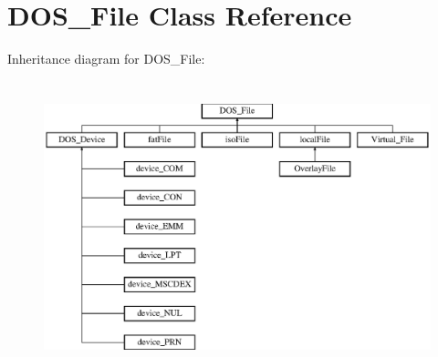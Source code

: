 \hypertarget{classDOS__File}{\section{D\-O\-S\-\_\-\-File Class Reference}
\label{classDOS__File}
}
Inheritance diagram for D\-O\-S\-\_\-\-File\-:\begin{figure}[H]
\begin{center}
\leavevmode
\includegraphics[height=8.470589cm]{classDOS__File}
\end{center}
\end{figure}

